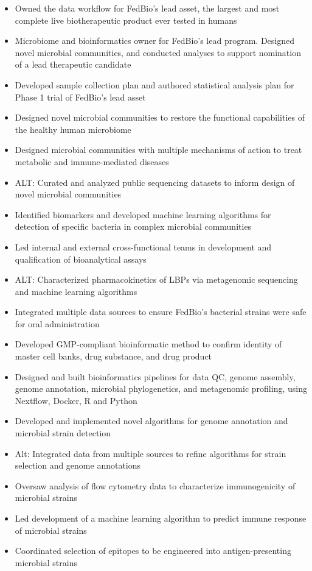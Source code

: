 \documentclass[letterpaper,10pt]{article}
\begin{document}
\begin{itemize}
\begin{itemize}
			\item Owned the data workflow for FedBio's lead asset, the largest and most complete live biotherapeutic product ever tested in humans
			\item Microbiome and bioinformatics owner for FedBio's lead program. Designed novel microbial communities, and conducted analyses to support nomination of a lead therapeutic candidate
			\item Developed sample collection plan and authored statistical analysis plan for Phase 1 trial of FedBio's lead asset
			\item Designed novel microbial communities to restore the functional capabilities of the healthy human microbiome
			\item Designed microbial communities with multiple mechanisms of action to treat metabolic and immune-mediated diseases
			\item ALT: Curated and analyzed public sequencing datasets to inform design of novel microbial communities
			\item Identified biomarkers and developed machine learning algorithms for detection of specific bacteria in complex microbial communities
			\item Led internal and external cross-functional teams in development and qualification of bioanalytical assays
			\item ALT: Characterized pharmacokinetics of LBPs via metagenomic sequencing and machine learning algorithms
			\item Integrated multiple data sources to ensure FedBio's bacterial strains were safe for oral administration
			\item Developed GMP-compliant bioinformatic method to confirm identity of master cell banks, drug substance, and drug product
			\item Designed and built bioinformatics pipelines for data QC, genome assembly, genome annotation, microbial phylogenetics, and metagenomic profiling, using Nextflow, Docker, R and Python
			\item Developed and implemented novel algorithms for genome annotation and microbial strain detection
			\item Alt: Integrated data from multiple sources to refine algorithms for strain selection and genome annotations
			

			\item Oversaw analysis of flow cytometry data to characterize immunogenicity of microbial strains
			\item Led development of a machine learning algorithm to predict immune response of microbial strains
			\item Coordinated selection of epitopes to be engineered into antigen-presenting microbial strains


\end{itemize}
\end{itemize}
\end{document}

